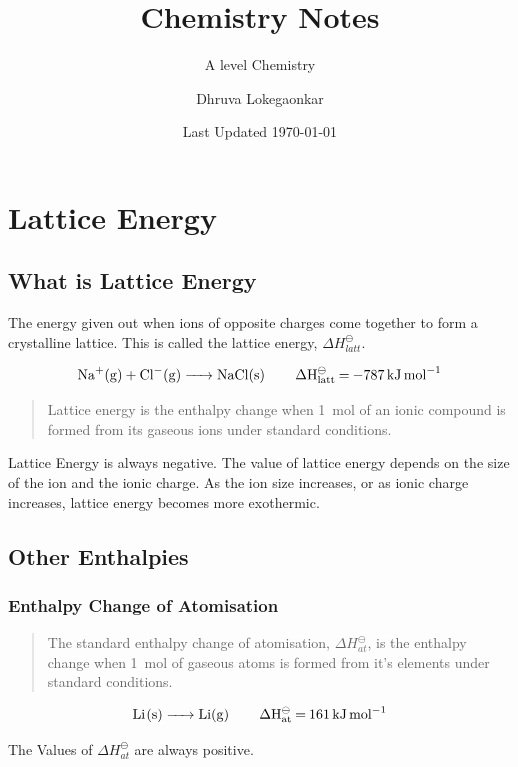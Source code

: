 \documentclass{scrbook}
\title{Chemistry Notes}
\subtitle{A level Chemistry}
\date{Last Updated \today{}}
\author{Dhruva Lokegaonkar}
\begin{document}
\maketitle
\tableofcontents

\chapter{Lattice Energy}

\section{What is Lattice Energy}

	The energy given out when ions of opposite charges come together to form a crystalline lattice. This is called the lattice energy, $\Delta H_{latt}^\ominus$.

	\[ \ce{Na+(g) + Cl-(g) ->  NaCl(s) \qquad \Delta H^\ominus_{latt} = \SI{-787}{ \kilo\joule\per\mole } }\]

	\begin{quote}
		Lattice energy is the enthalpy change when \SI{1}{\mole} of an ionic compound is formed from its gaseous ions under standard conditions.
	\end{quote}

	Lattice Energy is always negative. The value of lattice energy depends on the size of the ion and the ionic charge. As the ion size increases, or as ionic charge increases, lattice energy becomes more exothermic.

\section{Other Enthalpies}

\subsection{Enthalpy Change of Atomisation}

	\begin{quote}
		The standard enthalpy change of atomisation, $\Delta H_{at}^\ominus$, is the enthalpy change when \SI{1}{\mole} of gaseous atoms is formed from it's elements under standard conditions.
	\end{quote}

	\[ \ce{ Li(s) -> Li(g) \qquad \Delta H^\ominus_{at} = \SI{161}{\kilo\joule\per\mole} } \]

	The Values of $\Delta H^\ominus_{at}$ are always positive.
\end{document}

